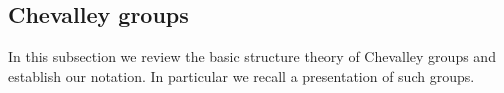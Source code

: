 \documentclass[10pt, letterpaper]{amsart}
\theoremstyle{plain}
\theoremstyle{definition}
\numberwithin{equation}{section}
\newcommand{\Wt}{\widetilde{W}}
\newcommand{\af}{\mathrm{af}}
\newcommand{\Ocal}{\mathcal{O}}
\begin{document}

\subsection{Chevalley groups}\label{SS:ChevGroup}

In this subsection we review the basic structure theory of Chevalley groups and establish our notation. In particular we recall a presentation of such groups.
\end{document}
